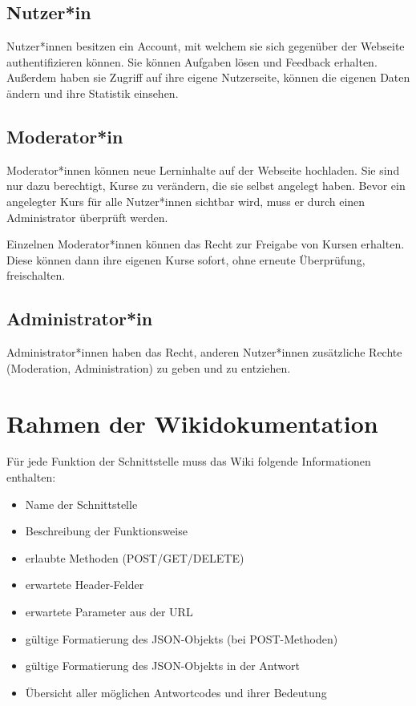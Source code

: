 \documentclass[accentcolor=tud0b,12pt,paper=a4]{tudreport}
\begin{document}
\subsection{Nutzer*in}
Nutzer*innen besitzen ein Account, mit welchem sie sich gegenüber der Webseite authentifizieren können. Sie können Aufgaben lösen und Feedback erhalten. Außerdem haben sie Zugriff auf ihre eigene Nutzerseite, können die eigenen Daten ändern und ihre Statistik einsehen.

\subsection{Moderator*in}
Moderator*innen können neue Lerninhalte auf der Webseite hochladen. Sie sind nur dazu berechtigt, Kurse zu verändern, die sie selbst angelegt haben. Bevor ein angelegter Kurs für alle Nutzer*innen sichtbar wird, muss er durch einen Administrator überprüft werden.

Einzelnen Moderator*innen können das Recht zur Freigabe von Kursen erhalten. Diese können dann ihre eigenen Kurse sofort, ohne erneute Überprüfung, freischalten.

\subsection{Administrator*in}
Administrator*innen haben das Recht, anderen Nutzer*innen zusätzliche Rechte (Moderation, Administration) zu geben und zu entziehen.

\section{Rahmen der Wikidokumentation}
Für jede Funktion der Schnittstelle muss das Wiki folgende Informationen enthalten:
\begin{multicols}{2}
\begin{itemize}
	\item Name der Schnittstelle
	\item Beschreibung der Funktionsweise
	\item erlaubte Methoden (POST/GET/DELETE)
	\item erwartete Header-Felder
	\item erwartete Parameter aus der URL
	\item gültige Formatierung des JSON-Objekts (bei POST-Methoden)
	\item gültige Formatierung des JSON-Objekts in der Antwort
	\item Übersicht aller möglichen Antwortcodes und ihrer Bedeutung
\end{itemize}
\end{multicols}
\pagebreak
\end{document}
